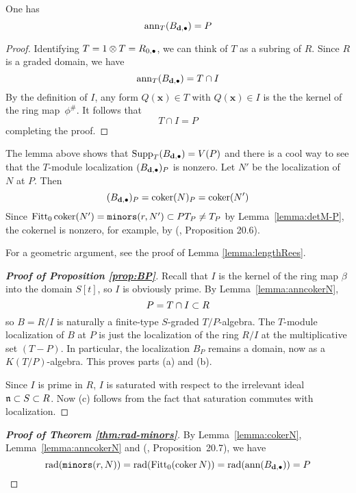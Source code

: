 \documentclass[fleqn,reqno]{amsart}
\numberwithin{first}{chapter}
\begin{document}
\begin{lemma}
\label{lemma:anncokerN}
One has
\[
	\operatorname{ann}_T (B_{\mathbf d,\bullet})=P
\]
\end{lemma}

\begin{proof}
Identifying $T=1\otimes T=R_{0,\bullet}$, we can think of $T$ as a subring of $R$.
Since $R$ is a graded domain, we have
\[
	\operatorname{ann}_T(B_{\mathbf d,\bullet})=T\cap I
\]
By the definition of $I$, any form $Q(\mathbf x)\in T$ with $Q(\mathbf x)\in I$ is the the kernel
of the ring map~$\phi^\#$. It follows that
\[
	T\cap I=P
\]
completing the proof.
\end{proof}

\begin{remarkhint}
The lemma above shows that $\operatorname{Supp}_T (B_{\mathbf d,\bullet})=V(P)$ and there is a cool way
to see that the $T$-module localization $(B_{\mathbf d,\bullet})_P$ is nonzero.
Let $N'$ be the localization of $N$ at $P$.
Then 
\[
	(B_{\mathbf d,\bullet})_P=\operatorname{coker}(N)_P=\operatorname{coker}(N')
\]
Since $\operatorname{Fitt}_0\operatorname{coker}(N')=\mathop{\tt minors}(r,N')\subset PT_P\neq T_P$ by Lemma~\ref{lemma:detM-P},
the cokernel is nonzero, for example, by (\citet{Eis95}, Proposition 20.6).

For a geometric argument, see the proof of Lemma \ref{lemma:lengthRees}.
\end{remarkhint}

\begin{proof}[\bf Proof of Proposition \ref{prop:BP}]
Recall that $I$ is the kernel of the ring map $\beta$ into the domain $S[t]$,
so $I$ is obviously prime.
By Lemma~\ref{lemma:anncokerN},
\[
	P=T\cap I\subset R
\]
so $B=R/I$ is naturally a finite-type $S$-graded $T/P$-algebra.
The $T$-module localization of $B$ at $P$ is just
the localization of the ring $R/I$ at the multiplicative set $(T-P)$.
In particular, the localization $B_P$ remains a domain,
now as a $K(T/P)$-algebra.
This proves parts (a) and (b).

Since $I$ is prime in $R$, $I$ is saturated with respect to the irrelevant ideal $\mathfrak{n}\subset S\subset R$.
Now (c) follows from the fact that saturation commutes with localization.
\end{proof}

\begin{proof}[\bf Proof of Theorem \ref{thm:rad-minors}]
By Lemma~\ref{lemma:cokerN}, Lemma~\ref{lemma:anncokerN} and
(\citet{Eis95}, Proposition~20.7),
we have
\[
	\operatorname{rad}(\mathop{\tt minors}(r,N))=\operatorname{rad}(\operatorname{Fitt}_0(\operatorname{coker} N))=\operatorname{rad}(\operatorname{ann} (B_{\mathbf d,\bullet}))=P\qedhere
\]
\end{proof}
\end{document}
